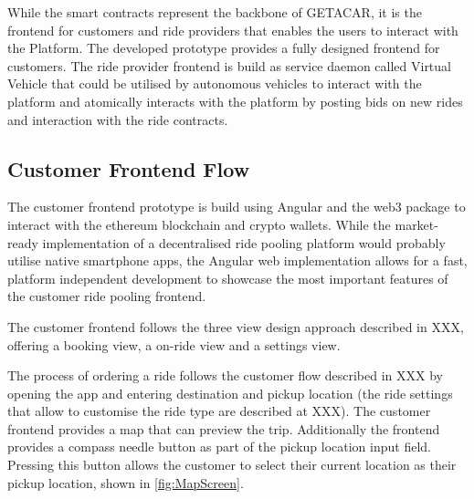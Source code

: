 While the smart contracts represent the backbone of GETACAR, it is the frontend for customers and ride providers that enables the users to interact with the Platform. The developed prototype provides a fully designed frontend  for customers. The ride provider frontend is build as service daemon called Virtual Vehicle that could be utilised by autonomous vehicles to interact with the platform and atomically interacts with the platform by posting bids on new rides and interaction with the ride contracts. 

\subsection{Customer Frontend Flow}
The customer frontend prototype is build using Angular and the web3 package to interact with the ethereum blockchain and crypto wallets. While the market-ready implementation of a decentralised ride pooling platform would probably utilise native smartphone apps, the Angular web implementation allows for a fast, platform independent development to showcase the most important features of the customer ride pooling frontend. 

The customer frontend follows the three view design approach described in XXX, offering a booking view, a on-ride view and a settings view. 

The process of ordering a ride follows the customer flow described in XXX by opening the app and entering destination and pickup location (the ride settings that allow to customise the ride type are described at XXX). The customer frontend provides a map that can preview the trip. Additionally the frontend provides  a compass needle button as part of the pickup location input field. Pressing this button allows the customer to select their current location as their pickup location, shown in \ref{fig:MapScreen}.

